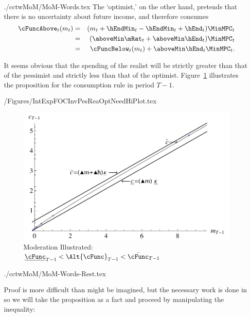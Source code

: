 \documentclass[titlepage]{\econtex}
\begin{document}
\begin{verbatimwrite}{./cctwMoM/MoM-Words.tex}
  The `optimist,' on the other hand, pretends that there is no uncertainty
  about future income, and therefore consumes
  \begin{eqnarray*}
    \cFuncAbove_{t}(m_{t}) & = & ({m}_{t} +\hEndMin_{t} - \hEndMin_{t} + \hEnd_{t} )\MinMPC_{t}
    \\   & = & (\aboveMin \mRat_{t} + \aboveMin \hEnd_{t})\MinMPC_{t}
    \\     & = & \cFuncBelow_{t}(m_{t})+\aboveMin \hEnd_{t} \MinMPC_{t}
                 .
  \end{eqnarray*}

  It seems obvious that the spending of the realist will be strictly greater
  than that of the pessimist and strictly less than that of the
  optimist.  Figure~\ref{fig:IntExpFOCInvPesReaOptNeedHiPlot} illustrates the proposition for the consumption rule in period $T-1$.  
\end{verbatimwrite}

\begin{verbatimwrite}{\econtexRoot/Figures/IntExpFOCInvPesReaOptNeedHiPlot.tex}
  \hypertarget{IntExpFOCInvPesReaOptNeedHiPlot}{}
  \begin{figure}
    \includegraphics{./Figures/IntExpFOCInvPesReaOptNeedHiPlot}
    \caption{Moderation Illustrated: $\underline{\cFunc}_{T-1} < \Alt{\cFunc}_{T-1} < \bar{\cFunc}_{T-1}$}
    \label{fig:IntExpFOCInvPesReaOptNeedHiPlot}
  \end{figure}
\end{verbatimwrite}

\begin{verbatimwrite}{./cctwMoM/MoM-Words-Rest.tex}

  \indent Proof is more difficult than might be imagined, but
  the necessary work is done in \cite{BufferStockTheory} so we will take
  the proposition as a fact and proceed by manipulating the inequality:
\end{verbatimwrite}
\end{document}
